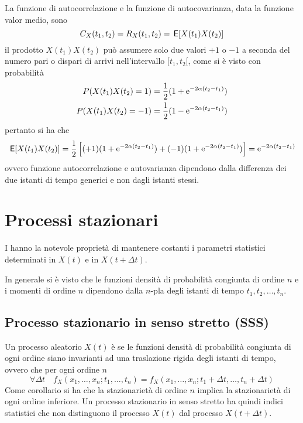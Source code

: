 La funzione di autocorrelazione e la funzione di autocovarianza, data la funzione valor medio, sono \[C_X(t_1,t_2)=R_X(t_1,t_2)=\,{\operatorname{\mathsf{E}}}\!\left[{X(t_1)X(t_2)}\right]\]
il prodotto $X(t_1)X(t_2)$ può assumere solo due valori $+1$ o $-1$ a seconda del numero pari o dispari di arrivi nell'intervallo $[t_1,t_2[$, come si è visto con probabilità
\[\begin{split}P(X(t_1)X(t_2)=1)&=\frac{1}{2}(1+\operatorname{e}^{-2\alpha(t_2-t_1)})\\
P(X(t_1)X(t_2)=-1)&=\frac{1}{2}(1-\operatorname{e}^{-2\alpha(t_2-t_1)})\end{split}\]
pertanto si ha che
\begin{equation}\begin{split}\,{\operatorname{\mathsf{E}}}\!\left[{X(t_1)X(t_2)}\right]=\frac{1}{2}\left[(+1)(1+\operatorname{e}^{-2\alpha(t_2-t_1)})+(-1)(1+\operatorname{e}^{-2\alpha(t_2-t_1)})\right]=\operatorname{e}^{-2\alpha(t_2-t_1)}\end{split}\end{equation}
ovvero funzione autocorrelazione e autovarianza dipendono dalla differenza dei due istanti di tempo generici e non dagli istanti stessi.

\section{Processi stazionari}
I  hanno la notevole proprietà di mantenere costanti i parametri statistici determinati in $X(t)$ e in $X(t+\Delta t)$.

In generale si è visto che le funzioni densità di probabilità congiunta di ordine $n$ e i momenti di ordine $n$ dipendono dalla $n$-pla degli istanti di tempo $t_1,t_2,\dots,t_n$.

\subsection{Processo stazionario in senso stretto (SSS)}
Un processo aleatorio $X(t)$ è  se le funzioni densità di probabilità congiunta di ogni ordine siano invarianti ad una traslazione rigida degli istanti di tempo, ovvero che per ogni ordine $n$
\begin{equation}
\forall\Delta t\quad f_X(x_1,\dots,x_n;t_1,\dots,t_n)=f_X(x_1,\dots,x_n;t_1+\Delta t,\dots,t_n+\Delta t)
\end{equation}
Come corollario si ha che la stazionarietà di ordine $n$ implica la stazionarietà di ogni ordine inferiore.
Un processo stazionario in senso stretto ha quindi indici statistici che non distinguono il processo $X(t)$ dal processo $X(t+\Delta t)$.

